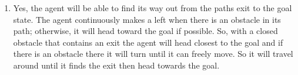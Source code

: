 \documentclass[letterpaper, 12pt]{article}
\begin{document}
\begin{enumerate}
\begin{enumerate}
        \item Yes, the agent will be able to find its way out from the paths exit to the goal state.
        The agent continuously makes a left when there is an obstacle in its path; otherwise, it will head 
        toward the goal if possible. So, with a closed obstacle that contains an exit the agent will head
        closest to the goal and if there is an obstacle there it will turn until it can freely move. So it
        will travel around until it finds the exit then head towards the goal.
        
    \end{enumerate}   
\end{enumerate}
\end{document}
